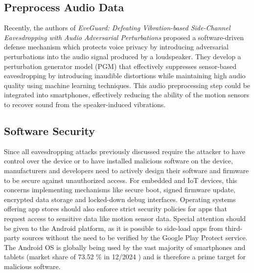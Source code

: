 \documentclass[sigconf, nonacm]{acmart}
\begin{document}
\subsection{Preprocess Audio Data}
Recently, the authors of \textit{EveGuard: Defeating Vibration-based Side-Channel Eavesdropping with Audio Adversarial Perturbations} \cite{EveGuard2024} proposed a software-driven defense mechanism which protects voice privacy by introducing adversarial perturbations into the audio signal produced by a loudspeaker.
They develop a perturbation generator model (PGM) that effectively suppresses sensor-based eavesdropping by introducing inaudible distortions while maintaining high audio quality using machine learning techniques.
This audio preprocessing step could be integrated into smartphones, effectively reducing the ability of the motion sensors to recover sound from the speaker-induced vibrations.

\subsection{Software Security}
Since all eavesdropping attacks previously discussed require the attacker to have control over the device or to have installed malicious software on the device, manufacturers and developers need to actively design their software and firmware to be secure against unauthorized access.
For embedded and IoT devices, this concerns implementing mechanisms like secure boot, signed firmware update, encrypted data storage and locked-down debug interfaces.
Operating systems offering app stores should also enforce strict security policies for apps that request access to sensitive data like motion sensor data.
Special attention should be given to the Android platform, as it is possible to side-load apps from third-party sources without the need to be verified by the Google Play Protect service. The Android OS is globally being used by the vast majority of smartphones and tablets (market share of 73.52 \% in 12/2024 \cite{StatcounterOSMarketShare}) and is therefore a prime target for malicious software.
\end{document}
